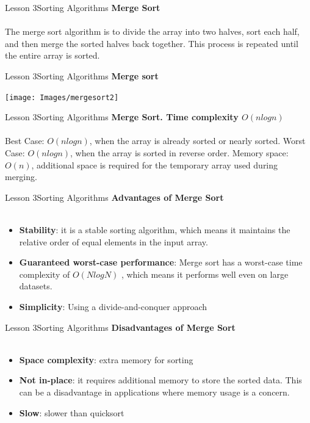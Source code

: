 \documentclass[aspectratio=1610]{beamer}
\begin{document}
\begin{frame}{Lesson 3}{Sorting Algorithms}
\LARGE
\textbf{Merge Sort}\\~\\
The merge sort algorithm is to divide the array into two halves, sort 
each half, and then merge the sorted halves back together. This 
process is repeated until the entire array is sorted.
\end{frame}



\begin{frame}{Lesson 3}{Sorting Algorithms}
\LARGE
\textbf{Merge sort}\\
\begin{center}
\texttt{[image: Images/mergesort2]}
\end{center}
\end{frame}



\begin{frame}{Lesson 3}{Sorting Algorithms}
\LARGE
\textbf{Merge Sort. Time complexity $O(n log n)$}\\~\\
Best Case: $O(n log n)$, when the array is already sorted or nearly 
sorted. Worst Case: $O(n log n)$, when the array is sorted in reverse 
order. Memory space: $O(n)$, additional space is required for the
temporary array used during merging.
\end{frame}


\begin{frame}{Lesson 3}{Sorting Algorithms}
\LARGE
\textbf{Advantages of Merge Sort}\\~\\
\Large
\begin{itemize}
	\item \textbf{Stability}: it is a stable sorting algorithm, which means it maintains the relative order of equal elements in the input array.	
	\item \textbf{Guaranteed worst-case performance}: Merge sort has a worst-case time complexity of $O(N logN)$ , which means it performs well even on large datasets.
	\item \textbf{Simplicity}: Using a divide-and-conquer approach
\end{itemize}
\end{frame}


\begin{frame}{Lesson 3}{Sorting Algorithms}
\LARGE
\textbf{Disadvantages of Merge Sort}\\~\\
\Large
\begin{itemize}
	\item \textbf{Space complexity}: extra memory for sorting
	\item \textbf{Not in-place}: it requires additional memory to store the sorted data. This can be a disadvantage in applications where memory usage is a concern.
	\item \textbf{Slow}: slower than quicksort
\end{itemize}
\end{frame}
\end{document}
